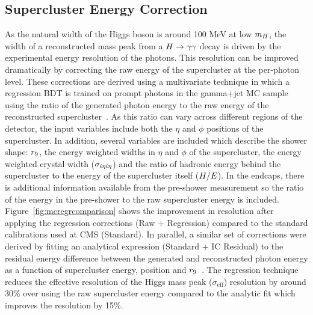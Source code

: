 \subsection{Supercluster Energy Correction}
\label{sec:superclusterenergyreconstruction}

As the natural width of the Higgs boson is around 100 MeV at low $m_{H}$, 
the width of a reconstructed mass peak from 
a $H\rightarrow\gamma\gamma$ decay is driven by the experimental energy resolution of the photons.
This resolution can be improved dramatically by correcting the raw energy of the supercluster 
at the per-photon level. These corrections are derived using a multivariate technique 
in which a regression BDT is trained on prompt photons in the gamma+jet MC sample using the 
ratio of the generated photon energy to the raw energy of the reconstructed supercluster~\citep{AN-12-160}.
As this ratio can vary across different regions of the detector, 
the input variables include both the $\eta$ and $\phi$ positions of the supercluster.
In addition, several variables are included which describe the shower shape: $r_{9}$, 
the energy weighted widths in $\eta$ and $\phi$ of the supercluster, the energy 
weighted crystal width ($\sigma_{i\eta i\eta}$) and the ratio of hadronic energy behind the supercluster
to the energy of the supercluster itself ($H/E$). 
In the endcaps, there is additional information 
available from the pre-shower measurement so the ratio of the energy in 
the pre-shower to the raw supercluster energy is included. 
Figure~\ref{fig:mcregrcomparison} shows the improvement
in resolution after applying the regression corrections (Raw + Regression) compared to the standard 
calibrations used at CMS (Standard). In parallel, a similar set of corrections were derived by 
fitting an analytical expression (Standard + IC Residual) to the residual energy difference between the 
generated and reconstructed photon energy as a function of 
supercluster energy, position and $r_{9}$~\citep{AN-11-343}. 
The regression technique reduces the effective resolution of the Higgs mass peak ($\sigma_{\mathrm{eff}}$) 
resolution by around 30\% over using the raw supercluster energy 
compared to the analytic fit which improves the resolution by 15\%. 

